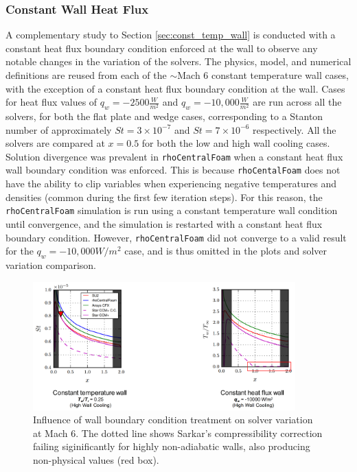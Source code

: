 \documentclass[journal ]{new-aiaa}
\begin{document}
\subsubsection{Constant Wall Heat Flux}

A complementary study to Section \ref{sec:const_temp_wall} is conducted with a constant heat flux boundary condition enforced at the wall to observe any notable changes in the variation of the solvers. The physics, model, and numerical definitions are reused from each of the $\sim$Mach 6 constant temperature wall cases, with the exception of a constant heat flux boundary condition at the wall. Cases for heat flux values of $q_w = -2500 \frac{W}{m^2}$ and $q_w = -10,000 \frac{W}{m^2}$ are run across all the solvers, for both the flat plate and wedge cases, corresponding to a Stanton number of approximately $St = 3 \times 10^{-7}$ and $St = 7 \times 10^{-6}$ respectively. All the solvers are compared at $x=0.5$ for both the low and high wall cooling cases. Solution divergence was prevalent in \texttt{rhoCentralFoam} when a constant heat flux wall boundary condition was enforced.
This is because \texttt{rhoCentalFoam} does not have the ability to clip variables when experiencing negative temperatures and densities (common during the first few iteration steps). For this reason, the \texttt{rhoCentralFoam} simulation is run using a constant temperature wall condition until convergence, and the simulation is restarted with a constant heat flux boundary condition. However, \texttt{rhoCentralFoam} did not converge to a valid result for the $q_w = -10,000 W/m^2$ case, and is thus omitted in the plots and solver variation comparison.

\begin{figure}[htb]
\centering
    \includegraphics[width=0.9\textwidth]{CHT/Wall_Heat_Flux_2.png}
  \caption{Influence of wall boundary condition treatment on solver variation at Mach 6. The dotted line shows Sarkar's compressibility correction failing siginificantly for highly non-adiabatic walls, also producing non-physical values (red box).}
  \label{fig:Sarkar}
\end{figure}
\end{document}
